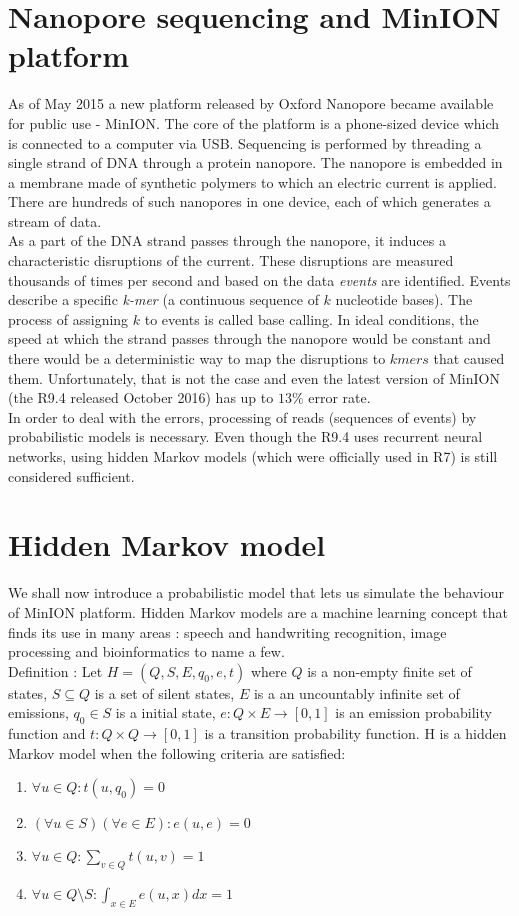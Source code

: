 \section{Nanopore sequencing and MinION platform}
As of May 2015 a new platform released by Oxford Nanopore became available for public use - MinION. The core of the platform is a phone-sized device which is connected to a computer via USB. Sequencing is performed by threading a single strand of DNA through a protein nanopore. The nanopore is embedded in a membrane made of synthetic polymers to which an electric current is applied. There are hundreds of such nanopores in one device, each of which generates a stream of data.\\
As a part of the DNA strand passes through the nanopore, it induces a characteristic disruptions of the current. These disruptions are measured thousands of times per second and based on the data \emph{events} are identified. Events describe a specific \emph{k-mer} (a continuous sequence of $k$ nucleotide bases). The process of assigning $k$ to events is called base calling. 
In ideal conditions, the speed at which the strand passes through the nanopore would be constant and there would be a deterministic way to map the disruptions to $kmers$ that caused them. Unfortunately, that is not the case and even the latest version of MinION (the R9.4 released October 2016) has up to $13\%$ error rate.\\
In order to deal with the errors, processing of reads (sequences of events) by probabilistic models is necessary. Even though the R9.4 uses recurrent neural networks, using hidden Markov models (which were officially used in R7) is still considered sufficient.

\section{Hidden Markov model}

We shall now introduce a probabilistic model that lets us simulate the behaviour of MinION platform.
Hidden Markov models are a machine learning concept that finds its use in many areas : speech and handwriting recognition, image processing and bioinformatics to name a few.\\

Definition \cite{RabatinBc2016}: Let $H = (Q,S,E,q_0,e,t)$ where $Q$ is a non-empty finite set of states, $S \subseteq Q$ is a set of silent states, $E$ is a an uncountably infinite set of emissions, $q_0 \in S$ is a initial state, $e : Q \times E \rightarrow [0,1]$ is an emission probability function and $t : Q \times Q \rightarrow [0,1]$ is a transition probability function. H is a hidden Markov model when the following criteria are satisfied:
\begin{enumerate}
	\item{
		$\forall u \in Q : t(u, q_0) = 0$
	}
	\item{
		$(\forall u \in S)(\forall e \in E): e(u,e) = 0$
	}
	\item{
		$\forall u \in Q: \sum_{v \in Q}{t(u,v)} = 1$
	}
	\item{
		$\forall u \in Q \setminus S : \int_{x \in E}{e(u,x)dx} = 1$
	}
\end{enumerate}

